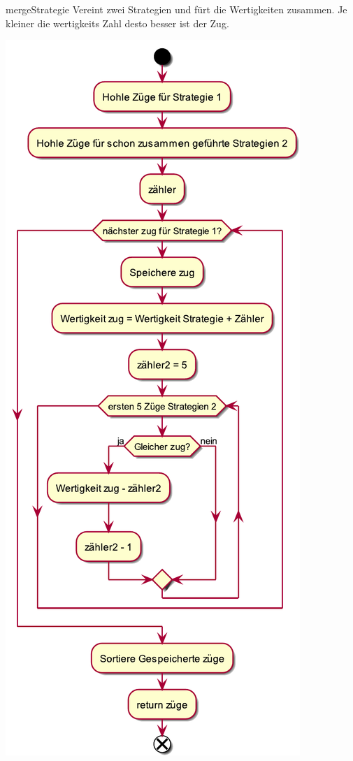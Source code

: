 \begin{DoxyItemize}
\item merge\+Strategie Vereint zwei Strategien und fürt die Wertigkeiten zusammen. Je kleiner die wertigkeits Zahl desto besser ist der Zug.  
\begin{DoxyImageNoCaption}
  \mbox{\includegraphics[width=\textwidth,height=\textheight/2,keepaspectratio=true]{KI_mergeStrategie}}
\end{DoxyImageNoCaption}
 

\end{DoxyItemize}
